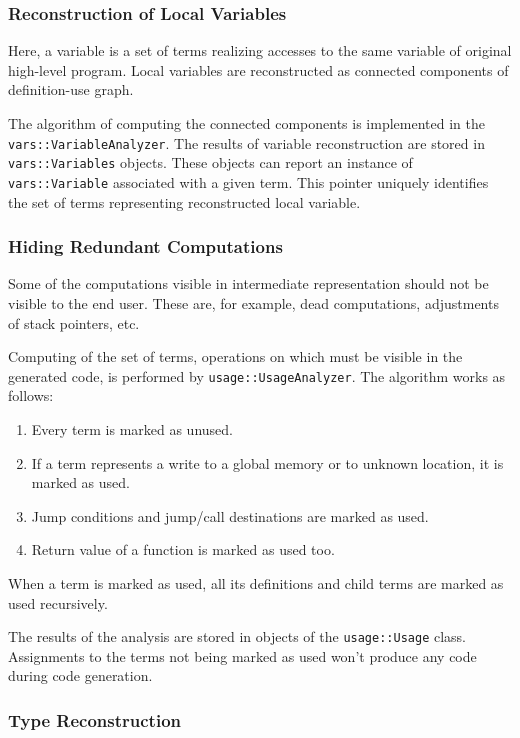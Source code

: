 \documentclass[a4paper,12pt]{article}
\newcommand{\ident}[1]{\texttt{#1}}
\begin{document}
\subsubsection{Reconstruction of Local Variables}

Here, a variable is a set of terms realizing accesses to the same variable of original high-level program.
Local variables are reconstructed as connected components of definition-use graph.

The algorithm of computing the connected components is implemented in the \ident{vars::VariableAnalyzer}.
The results of variable reconstruction are stored in \ident{vars::Variables} objects.
These objects can report an instance of \ident{vars::Variable} associated with a given term.
This pointer uniquely identifies the set of terms representing reconstructed local variable.

\subsubsection{Hiding Redundant Computations}

Some of the computations visible in intermediate representation should not be visible to the end user.
These are, for example, dead computations, adjustments of stack pointers, etc.

Computing of the set of terms, operations on which must be visible in the generated code, is performed by \ident{usage::UsageAnalyzer}.
The algorithm works as follows:
\begin{enumerate}
\item Every term is marked as unused.
\item If a term represents a write to a global memory or to unknown location, it is marked as used.
\item Jump conditions and jump/call destinations are marked as used.
\item Return value of a function is marked as used too.
\end{enumerate}
When a term is marked as used, all its definitions and child terms are marked as used recursively.

The results of the analysis are stored in objects of the \ident{usage::Usage} class.
Assignments to the terms not being marked as used won't produce any code during code generation.

\subsubsection{Type Reconstruction}
\end{document}
